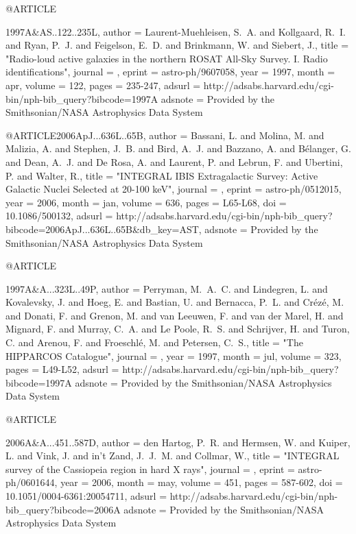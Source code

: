 {{{{@ARTICLE{1997A&AS..122..235L,
   author = {{Laurent-Muehleisen}, S.~A. and {Kollgaard}, R.~I. and {Ryan}, P.~J. and 
	{Feigelson}, E.~D. and {Brinkmann}, W. and {Siebert}, J.},
    title = "{Radio-loud active galaxies in the northern ROSAT All-Sky Survey. I. Radio identifications}",
  journal = {\aaps},
   eprint = {astro-ph/9607058},
     year = 1997,
    month = apr,
   volume = 122,
    pages = {235-247},
   adsurl = {http://adsabs.harvard.edu/cgi-bin/nph-bib_query?bibcode=1997A%
  adsnote = {Provided by the Smithsonian/NASA Astrophysics Data System}
}



@ARTICLE{2006ApJ...636L..65B,
   author = {{Bassani}, L. and {Molina}, M. and {Malizia}, A. and {Stephen}, J.~B. and 
	{Bird}, A.~J. and {Bazzano}, A. and {B{\'e}langer}, G. and {Dean}, A.~J. and 
	{De Rosa}, A. and {Laurent}, P. and {Lebrun}, F. and {Ubertini}, P. and 
	{Walter}, R.},
    title = "{INTEGRAL IBIS Extragalactic Survey: Active Galactic Nuclei Selected at 20-100 keV}",
  journal = {\apjl},
   eprint = {astro-ph/0512015},
     year = 2006,
    month = jan,
   volume = 636,
    pages = {L65-L68},
      doi = {10.1086/500132},
   adsurl = {http://adsabs.harvard.edu/cgi-bin/nph-bib_query?bibcode=2006ApJ...636L..65B&db_key=AST},
  adsnote = {Provided by the Smithsonian/NASA Astrophysics Data System}
}



@ARTICLE{1997A&A...323L..49P,
   author = {{Perryman}, M.~A.~C. and {Lindegren}, L. and {Kovalevsky}, J. and 
	{Hoeg}, E. and {Bastian}, U. and {Bernacca}, P.~L. and {Cr{\'e}z{\'e}}, M. and 
	{Donati}, F. and {Grenon}, M. and {van Leeuwen}, F. and {van der Marel}, H. and 
	{Mignard}, F. and {Murray}, C.~A. and {Le Poole}, R.~S. and 
	{Schrijver}, H. and {Turon}, C. and {Arenou}, F. and {Froeschl{\'e}}, M. and 
	{Petersen}, C.~S.},
    title = "{The HIPPARCOS Catalogue}",
  journal = {\aap},
     year = 1997,
    month = jul,
   volume = 323,
    pages = {L49-L52},
   adsurl = {http://adsabs.harvard.edu/cgi-bin/nph-bib_query?bibcode=1997A%
  adsnote = {Provided by the Smithsonian/NASA Astrophysics Data System}
}



@ARTICLE{2006A&A...451..587D,
   author = {{den Hartog}, P.~R. and {Hermsen}, W. and {Kuiper}, L. and {Vink}, J. and 
	{in't Zand}, J.~J.~M. and {Collmar}, W.},
    title = "{INTEGRAL survey of the Cassiopeia region in hard X rays}",
  journal = {\aap},
   eprint = {astro-ph/0601644},
     year = 2006,
    month = may,
   volume = 451,
    pages = {587-602},
      doi = {10.1051/0004-6361:20054711},
   adsurl = {http://adsabs.harvard.edu/cgi-bin/nph-bib_query?bibcode=2006A%
  adsnote = {Provided by the Smithsonian/NASA Astrophysics Data System}
}



}}}}}}}
